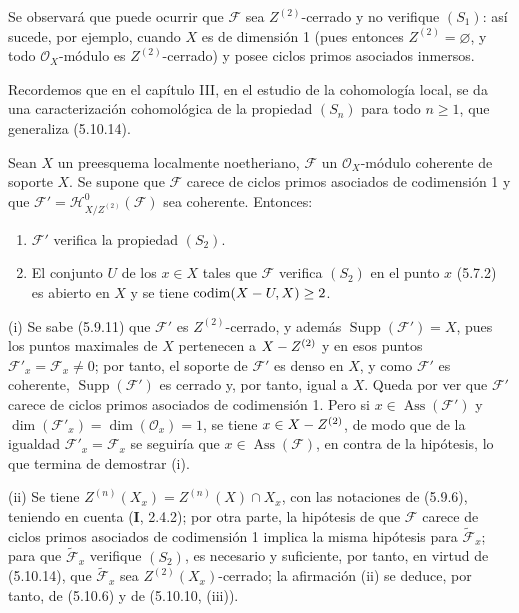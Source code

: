 Se observará que puede ocurrir que $\mathcal F$ sea $Z^{(2)}$-cerrado y no
verifique $(S_1)$: así sucede, por ejemplo, cuando $X$ es de dimensión 1
(pues entonces $Z^{(2)}=\varnothing$, y todo $\mathcal O_X$-módulo es
$Z^{(2)}$-cerrado) y posee ciclos primos asociados inmersos.

Recordemos que en el capítulo III, en el estudio de la cohomología local, se
da una caracterización cohomológica de la propiedad $(S_n)$ para todo
$n\geq1$, que generaliza (5.10.14).

\begin{corollary}[5.10.15]
\label{IV.2.s5.10.15-fr}
Sean $X$ un preesquema localmente noetheriano, $\mathcal F$ un
$\mathcal O_X$-módulo coherente de soporte $X$. Se supone que $\mathcal F$
carece de ciclos primos asociados de codimensión 1 y que
$\mathcal F'=\mathcal H^0_{X/Z^{(2)}}(\mathcal F)$ sea coherente. Entonces:
\begin{enumerate}
\item[\textup{(i)}] $\mathcal F'$ verifica la propiedad $(S_2)$.


\item[\textup{(ii)}] El conjunto $U$ de los $x\in X$ tales que $\mathcal F$ verifica
$(S_2)$ en el punto $x$ \textup{(5.7.2)} es abierto en $X$ y se tiene
$\operatorname{codim}(X- U,X)\geq2$.
\end{enumerate}
\end{corollary}

(i) Se sabe (5.9.11) que $\mathcal F'$ es $Z^{(2)}$-cerrado, y además
$\operatorname{Supp}(\mathcal F')=X$, pues los puntos maximales de $X$
pertenecen a $X- Z^{(2)}$ y en esos puntos
$\mathcal F'_x=\mathcal F_x\neq0$; por tanto, el soporte de $\mathcal F'$ es
denso en $X$, y como $\mathcal F'$ es coherente,
$\operatorname{Supp}(\mathcal F')$ es cerrado y, por tanto, igual a $X$. Queda
por ver que $\mathcal F'$ carece de ciclos primos asociados de codimensión 1.
Pero si $x\in\operatorname{Ass}(\mathcal F')$ y
$\dim(\mathcal F'_x)=\dim(\mathcal O_x)=1$, se tiene $x\in X- Z^{(2)}$, de
modo que de la igualdad $\mathcal F'_x=\mathcal F_x$ se seguiría que
$x\in\operatorname{Ass}(\mathcal F)$, en contra de la hipótesis, lo que
termina de demostrar (i).

(ii) Se tiene $Z^{(n)}(X_x)=Z^{(n)}(X)\cap X_x$, con las notaciones de
(5.9.6), teniendo en cuenta (\textbf I, 2.4.2); por otra parte, la hipótesis de que
$\mathcal F$ carece de ciclos primos asociados de codimensión 1 implica la
misma hipótesis para $\widetilde{\mathcal F}_x$; para que
$\widetilde{\mathcal F}_x$ verifique $(S_2)$, es necesario y suficiente, por
tanto, en virtud de (5.10.14), que $\widetilde{\mathcal F}_x$ sea
$Z^{(2)}(X_x)$-cerrado; la afirmación (ii) se deduce, por tanto, de (5.10.6) y
de (5.10.10, (iii)).
